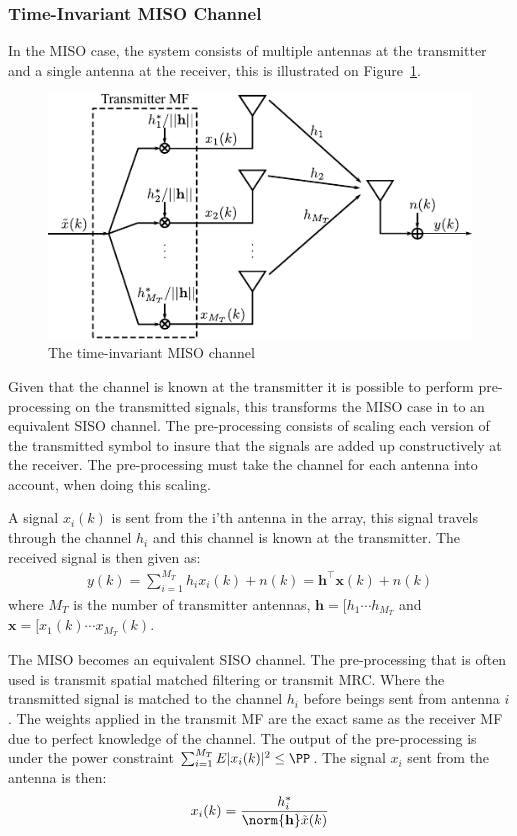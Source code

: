 \subsubsection{Time-Invariant MISO Channel}
In the MISO case, the system consists of multiple antennas at the transmitter and a single antenna at the receiver, this is illustrated on Figure~\ref{fig:misoModel}.
\begin{figure}[htbp]
  \centering
  \includegraphics[scale=1.2]{img/analysis/misoModel}
  \caption{The time-invariant MISO channel}
  \label{fig:misoModel}
\end{figure}
Given that the channel is known at the transmitter it is possible to perform pre-processing on the transmitted signals, this transforms the MISO case in to an equivalent SISO channel. The pre-processing consists of scaling each version of the transmitted symbol to insure that the signals are added up constructively at the receiver. The pre-processing must take the channel for each antenna into account, when doing this scaling. 

A signal $x_i(k)$ is sent from the i'th antenna in the array, this signal travels through the channel $h_i$ and this channel is known at the transmitter. The received signal is then given as\cite{Tim2012Practical}: 
\begin{align*}
  y(k) = \sum_{i=1}^{M_T} h_ix_i(k) + n(k) = \mathbf{h}^\intercal \mathbf{x}(k) + n(k)
\end{align*}
where $M_T$ is the number of transmitter antennas, $\mathbf{h} = [h_1 \cdots h_{M_T}$ and $\mathbf{x} = [x_1(k) \cdots x_{M_T}(k)$. 

The MISO becomes an equivalent SISO channel. The pre-processing that is often used is transmit spatial matched filtering or transmit MRC. Where the transmitted signal is matched to the channel $h_i$ before beings sent from antenna $i$. The weights applied in the transmit MF are the exact same as the receiver MF due to perfect knowledge of the channel\cite{Tim2012Practical}. The output of the pre-processing is under the power constraint $\sum_{i=1}^{M_T} E|x_i(k)|^2 \leq \PP$. The signal $x_i$ sent from the antenna is then\cite{Tim2012Practical}: 
\begin{align*}
  x_i(k) = \frac{h_i^*}{\norm{\mathbf{h}} \tilde{x}(k)}
\end{align*}

